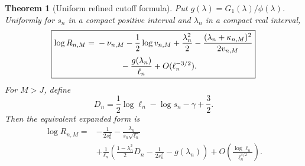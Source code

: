 \documentclass[11pt,a4paper]{article}
\numberwithin{equation}{section}
\newtheorem{theorem}{Theorem}[section]
\theoremstyle{definition}
\theoremstyle{remark}
\newcommand{\ph}{\phi}
\begin{document}
\begin{theorem}[Uniform refined cutoff formula]
\label{thm:refined}
Put $g(\lambda)=G_1(\lambda)/\ph(\lambda)$. Uniformly for $s_n$ in a
compact positive interval and $\lambda_n$ in a compact real interval,
\begin{equation}\label{eq:refinedexact}
 \boxed{\begin{aligned}
 \log R_{n,M}={}&-\nu_{n,M}-\frac12\log v_{n,M}
       +\frac{\lambda_n^2}{2}
       -\frac{(\lambda_n+\kappa_{n,M})^2}{2v_{n,M}}\\
 &\hspace{10mm}-\frac{g(\lambda_n)}{\ell_n}
       +O(\ell_n^{-3/2}).
 \end{aligned}}
\end{equation}
For $M>J$, define
\begin{equation}\label{eq:D}
 D_n=\frac12\log\ell_n-\log s_n-\gamma+\frac32.
\end{equation}
Then the equivalent expanded form is
\begin{equation}\label{eq:refinedexpanded}
 \boxed{\begin{aligned}
 \log R_{n,M}={}&-\frac1{2s_n^2}
       -\frac{\lambda_n}{s_n\sqrt{\ell_n}}\\
 &+\frac1{\ell_n}
   \left(\frac{1-\lambda_n^2}{2}D_n
        -\frac1{2s_n^2}-g(\lambda_n)\right)
   +O\left(\frac{\log\ell_n}{\ell_n^{3/2}}\right).
 \end{aligned}}
\end{equation}
\end{theorem}
\end{document}

